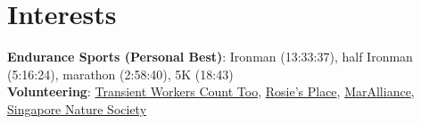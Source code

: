 \documentclass[letterpaper,11pt]{article}
\begin{document}
\vspace{-15pt}\section{Interests}
 \begin{itemize}[leftmargin=0.15in, label={}]
    \small{\item{
     \textbf{Endurance Sports (Personal Best)}{: Ironman (13:33:37), half Ironman (5:16:24), marathon (2:58:40), 5K (18:43)} \\
     \textbf{Volunteering}{: \href{https://twc2.org.sg/}{Transient Workers Count Too}, \href{https://www.rosiesplace.org/}{Rosie's Place}, \href{https://maralliance.org/}{MarAlliance}, \href{https://www.nss.org.sg/}{Singapore Nature Society}} \\
    }}
 \end{itemize}

\end{document}
